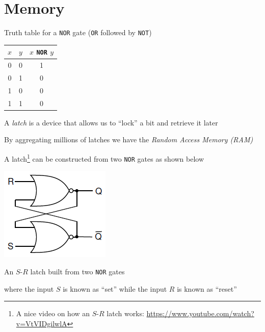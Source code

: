 \documentclass[8pt,a4paper,compress]{beamer}
\begin{document}
\section{Memory}
\begin{frame}[fragile]
Truth table for a \lstinline{NOR} gate (\lstinline{OR} followed by \lstinline{NOT})
\begin{center}
\begin{tabular}{cc|c}
$x$ & $y$ & $x$ \lstinline$NOR$ $y$ \\ \hline
0 & 0 & 1 \\
0 & 1 & 0 \\
1 & 0 & 0 \\
1 & 1 & 0
\end{tabular}
\end{center}

\bigskip

A \emph{latch} is a device that allows us to ``lock'' a bit and retrieve it later

\bigskip

By aggregating millions of latches we have the \emph{Random Access Memory (RAM)}

\bigskip

A latch\footnote{A nice video on how an $S$-$R$ latch works: \href{https://www.youtube.com/watch?v=VtVIDgilwlA}{https://www.youtube.com/watch?v=VtVIDgilwlA}} can be constructed from two \lstinline{NOR} gates as shown below
\begin{center}
\includegraphics[scale=0.4]{figures/latch.png}

\smallskip

\tiny An $S$-$R$ latch built from two \lstinline{NOR} gates
\end{center}
where the input $S$ is known as ``set'' while the input $R$ is known as ``reset''
\end{frame}
\end{document}
